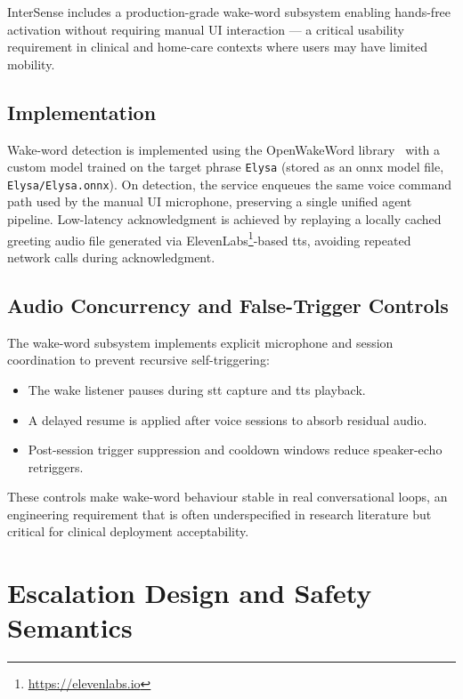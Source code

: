 \documentclass[10pt,twocolumn,a4paper]{article}
\begin{document}
InterSense includes a production-grade wake-word subsystem enabling
hands-free activation without requiring manual UI interaction — a
critical usability requirement in clinical and home-care contexts where
users may have limited mobility.

\subsection{Implementation}

Wake-word detection is implemented using the OpenWakeWord
library~\cite{openwakeword2023} with a custom model trained on the
target phrase \texttt{Elysa} (stored as an \gls{onnx} model file,
\texttt{Elysa/Elysa.onnx}).  On
detection, the service enqueues the same voice command path used by the
manual UI microphone, preserving a single unified agent pipeline.
Low-latency acknowledgment is achieved by replaying a locally cached
greeting audio file generated via ElevenLabs\footnote{\url{https://elevenlabs.io}}-based \gls{tts}, avoiding
repeated network calls during acknowledgment.

\subsection{Audio Concurrency and False-Trigger Controls}

The wake-word subsystem implements explicit microphone and session
coordination to prevent recursive self-triggering:
\begin{itemize}
  \item The wake listener pauses during \gls{stt} capture and
        \gls{tts} playback.
  \item A delayed resume is applied after voice sessions to absorb
        residual audio.
  \item Post-session trigger suppression and cooldown windows reduce
        speaker-echo retriggers.
\end{itemize}
These controls make wake-word behaviour stable in real conversational
loops, an engineering requirement that is often underspecified in
research literature but critical for clinical deployment acceptability.

\section{Escalation Design and Safety Semantics}
\end{document}

